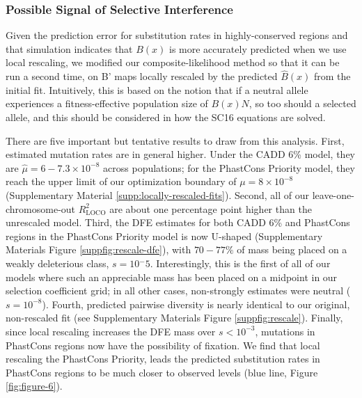 \documentclass[11pt]{article}
\begin{document}
\subsubsection*{Possible Signal of Selective Interference}

Given the prediction error for substitution rates in highly-conserved regions and that simulation indicates that $B(x)$ is more accurately predicted when we use local rescaling, we modified our composite-likelihood method so that it can be run a second time, on B' maps locally rescaled by the predicted $\widehat{B}(x)$ from the initial fit. Intuitively, this is based on the notion that if a neutral allele experiences a fitness-effective population size of $B(x)N$, so too should a selected allele, and this should be considered in how the SC16 equations are solved.

There are five important but tentative results to draw from this analysis.
First, estimated mutation rates are in general higher. Under the CADD 6\%
model, they are $\widehat{\mu} = 6-7.3 \times 10^{-8}$ across populations; for
the PhastCons Priority model, they reach the upper limit of our optimization
boundary of $\mu = 8 \times 10^{-8}$ (Supplementary Material
\ref{supp:locally-rescaled-fits}). Second, all of our leave-one-chromosome-out
$R_\text{LOCO}^2$ are about one percentage point higher than the unrescaled
model. Third, the DFE estimates for both CADD 6\% and PhastCons regions in the
PhastCons Priority model is now U-shaped (Supplementary Materials Figure
\ref{suppfig:rescale-dfe}), with $70-77\%$ of mass being placed on a weakly
deleterious class, $s=10{^-5}$. Interestingly, this is the first of all of our
models where such an appreciable mass has been placed on a midpoint in our
selection coefficient grid; in all other cases, non-strongly estimates were
neutral ($s=10^{-8}$). Fourth, predicted pairwise diversity is nearly identical to our original, non-rescaled fit (see Supplementary Materials Figure \ref{suppfig:rescale}). Finally, since local rescaling increases the DFE mass over $s < 10^{-3}$, mutations in PhastCons regions now have the possibility of fixation. We find that local rescaling the PhastCons Priority, leads the predicted substitution rates in PhastCons regions to be much closer to observed levels (blue line, Figure \ref{fig:figure-6}).
\end{document}
